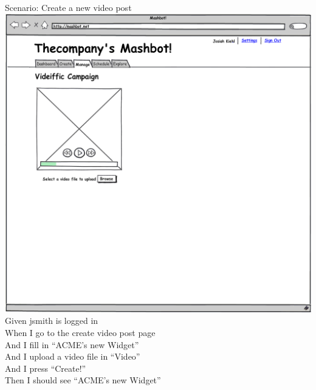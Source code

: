 \documentclass[12pt]{article}
\begin{document}
\begin{hangparas}{0.25in}{1}
  Scenario: Create a new video post \\
\includegraphics[width=\textwidth]{../mockups/manage-create-video.png}
    Given jsmith is logged in \\
    When I go to the create video post page \\
    And I fill in ``ACME's new Widget'' \\
    And I upload a video file in ``Video'' \\
    And I press ``Create!'' \\
    Then I should see ``ACME's new Widget'' \\
  

\end{hangparas}
\end{document}
